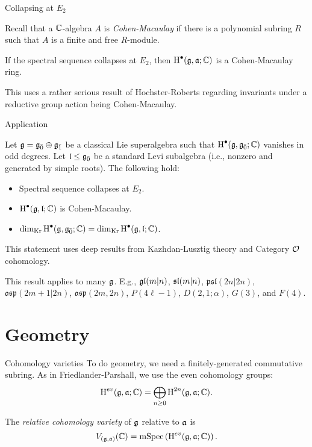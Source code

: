 \documentclass{beamer}
\begin{document}
\begin{frame}{Collapsing at $E_2$}\pause
  \begin{definition}
    Recall that a $\CC$-algebra $A$ is \emph{Cohen-Macaulay} if there is a polynomial subring $R$ such that $A$ is a finite and free $R$-module.
  \end{definition}
  \pause
  \begin{theorem}
   If the spectral sequence collapses at $E_2$, then $\H^\bullet(\g,\a;\CC)$ is a Cohen-Macaulay ring.
  \end{theorem}
 \pause
   This uses a rather serious result of Hochster-Roberts regarding invariants under a reductive group action being Cohen-Macaulay.
\end{frame}

\begin{frame}{Application}\pause
  \begin{theorem}
    Let $\g = \even{\g} \oplus \odd{\g}$ be a classical Lie superalgebra such that $\H^\bullet(\g,\even{\g};\CC)$ vanishes in odd degrees. Let $\l \leq \even{\g}$ be a standard Levi subalgebra (i.e., nonzero and generated by simple roots). The following hold:
    \begin{itemize}
    \pause\item Spectral sequence collapses at $E_2$.
    \pause\item $\H^\bullet(\g,\l;\CC)$ is Cohen-Macaulay.
    \pause\item $\kdim \H^\bullet(\g,\even{\g};\CC) = \kdim \H^\bullet(\g,\l;\CC)$.
    \end{itemize}
  \end{theorem}
  
  \pause This statement uses deep results from Kazhdan-Lusztig theory and Category $\O$ cohomology.

  \pause
\begin{example}
  This result applies to many $\g$. E.g., $\gl(m|n)$, $\sl(m|n)$, $\mathfrak{psl}(2n|2n)$, $\mathfrak{osp}(2m+1|2n)$, $\mathfrak{osp}(2m,2n)$, $P(4\ell - 1)$, $D(2,1;\alpha)$, $G(3)$, and $F(4)$.
\end{example}
\end{frame}

\section{Geometry}

\begin{frame}{Cohomology varieties} \pause
  To do geometry, we need a finitely-generated commutative subring. As in Friedlander-Parshall, we use the even cohomology groups:
  \[
    \H^{ev}(\g,\a;\CC) = \bigoplus_{n \geq 0} \H^{2n}(\g,\a;\CC).
  \]
  \pause
  \begin{definition}
    The \emph{relative cohomology variety} of $\g$ relative to $\a$ is
    \[
      V_{(\g,\a)}(\CC) = \maxspec\left(\H^{ev}(\g,\a;\CC)\right).
    \]
    
  \end{definition}
\end{frame}
\end{document}
